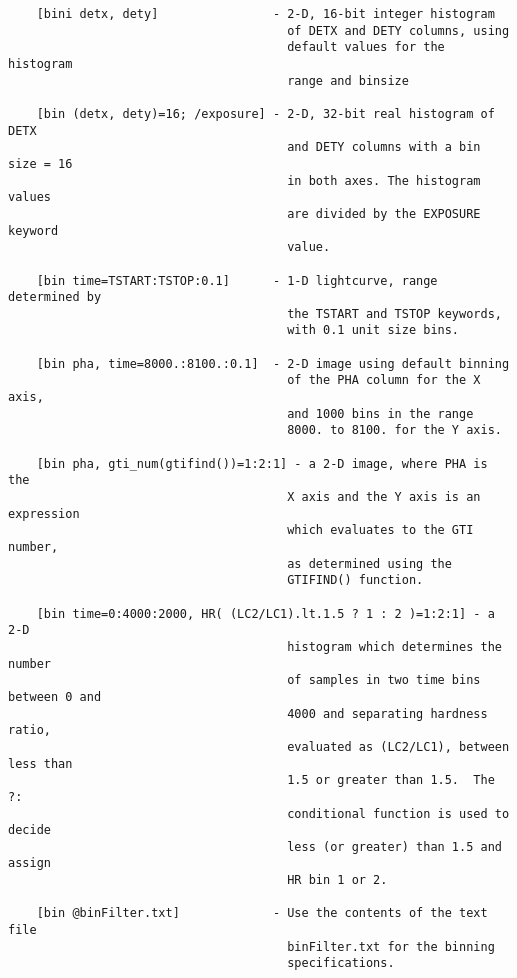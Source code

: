\documentclass[11pt]{book}
\begin{document}
\begin{verbatim}
    [bini detx, dety]                - 2-D, 16-bit integer histogram
                                       of DETX and DETY columns, using
                                       default values for the histogram
                                       range and binsize

    [bin (detx, dety)=16; /exposure] - 2-D, 32-bit real histogram of DETX
                                       and DETY columns with a bin size = 16
                                       in both axes. The histogram values
                                       are divided by the EXPOSURE keyword
                                       value.

    [bin time=TSTART:TSTOP:0.1]      - 1-D lightcurve, range determined by
                                       the TSTART and TSTOP keywords,
                                       with 0.1 unit size bins.

    [bin pha, time=8000.:8100.:0.1]  - 2-D image using default binning
                                       of the PHA column for the X axis,
                                       and 1000 bins in the range
                                       8000. to 8100. for the Y axis.

    [bin pha, gti_num(gtifind())=1:2:1] - a 2-D image, where PHA is the
                                       X axis and the Y axis is an expression
                                       which evaluates to the GTI number, 
                                       as determined using the
                                       GTIFIND() function.

    [bin time=0:4000:2000, HR( (LC2/LC1).lt.1.5 ? 1 : 2 )=1:2:1] - a 2-D
                                       histogram which determines the number
                                       of samples in two time bins between 0 and
                                       4000 and separating hardness ratio, 
                                       evaluated as (LC2/LC1), between less than
                                       1.5 or greater than 1.5.  The ?: 
                                       conditional function is used to decide
                                       less (or greater) than 1.5 and assign
                                       HR bin 1 or 2.

    [bin @binFilter.txt]             - Use the contents of the text file
                                       binFilter.txt for the binning
                                       specifications.

\end{verbatim}
\end{document}
